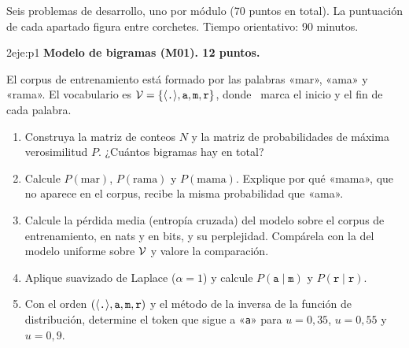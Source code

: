 
Seis problemas de desarrollo, uno por módulo (70 puntos en total). La puntuación de cada apartado figura entre corchetes. Tiempo orientativo: 90 minutos.

\begin{ejercicio}{2}{eje:p1}
\textbf{Modelo de bigramas (M01). 12 puntos.}

El corpus de entrenamiento está formado por las palabras «mar», «ama» y «rama». El vocabulario es $\mathcal{V}=\{\langle\texttt{.}\rangle,\texttt{a},\texttt{m},\texttt{r}\}$, donde \fin\ marca el inicio y el fin de cada palabra.
\begin{enumerate}[label=(\alph*)]
  \item {} Construya la matriz de conteos $N$ y la matriz de probabilidades de máxima verosimilitud $P$. ¿Cuántos bigramas hay en total?
  \item {} Calcule $P(\text{mar})$, $P(\text{rama})$ y $P(\text{mama})$. Explique por qué «mama», que no aparece en el corpus, recibe la misma probabilidad que «ama».
  \item {} Calcule la pérdida media (entropía cruzada) del modelo sobre el corpus de entrenamiento, en nats y en bits, y su perplejidad. Compárela con la del modelo uniforme sobre $\mathcal{V}$ y valore la comparación.
  \item {} Aplique suavizado de Laplace ($\alpha=1$) y calcule $P(\texttt{a}\mid\texttt{m})$ y $P(\texttt{r}\mid\texttt{r})$.
  \item {} Con el orden $(\langle\texttt{.}\rangle,\texttt{a},\texttt{m},\texttt{r})$ y el método de la inversa de la función de distribución, determine el token que sigue a «\texttt{a}» para $u=0{,}35$, $u=0{,}55$ y $u=0{,}9$.
\end{enumerate}
\end{ejercicio}

